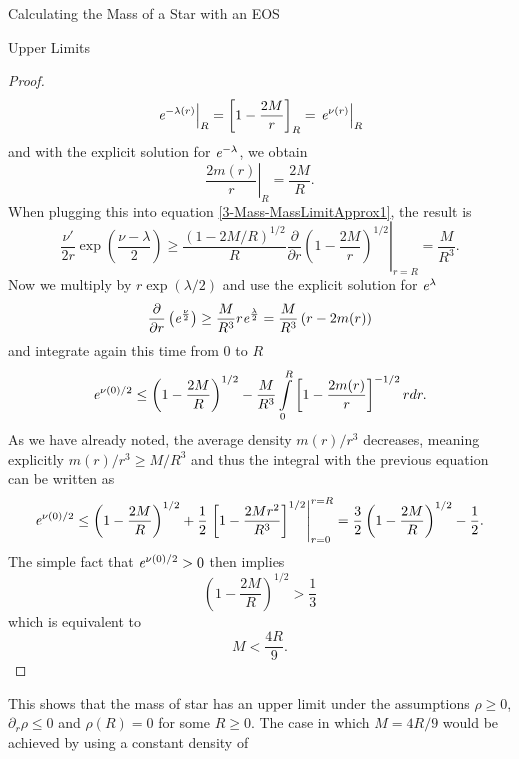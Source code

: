 \begin{section}{Calculating the Mass of a Star with an EOS}
\begin{subsection}{Upper Limits}
\begin{proof}
	\begin{equation}
		\left.\mathit{e}^{-\lambda(r)}\right|_R=\left[1-\frac{2M}{r}\right]_R=\left.\mathit{e}^{\nu(r)}\right|_R
		\label{3-Mass-MassLimitApprox1}
	\end{equation}
	and with the explicit solution for $\mathit{e}^{-\lambda}$, we obtain
	\begin{equation}
		\left.\frac{2m(r)}{r}\right|_R = \frac{2M}{R}.
	\end{equation}
	When plugging this into equation \eqref{3-Mass-MassLimitApprox1}, the result is
	\begin{equation}
		\frac{\nu'}{2r}\exp\left(\frac{\nu-\lambda}{2}\right)\geq\frac{(1-2M/R)^{1/2}}{R}\left.\frac{\partial}{\partial r}\left(1-\frac{2M}{r}\right)^{1/2}\right|_{r=R} = \frac{M}{R^3}.
	\end{equation}
	Now we multiply by $r\exp(\lambda/2)$ and use the explicit solution for $\mathit{e}^\lambda$
	\begin{equation}
		\frac{\partial}{\partial r}\left(\mathit{e}^{\frac{\nu}{2}}\right) \geq \frac{M}{R^3}r\mathit{e}^\frac{\lambda}{2} = \frac{M}{R^3}\left(r-2m(r)\right)
	\end{equation}
	and integrate again this time from $0$ to $R$
	\begin{equation}
		\mathit{e}^{\nu(0)/2}\leq\left(1-\frac{2M}{R}\right)^{1/2}-\frac{M}{R^3}\int\limits_0^R\left[1-\frac{2m(r)}{r} \right]^{-1/2}rdr.
		\label{3-Mass-MassLimitNuApprox}
	\end{equation}
	As we have already noted, the average density $m(r)/r^3$ decreases, meaning explicitly $m(r)/r^3\geq M/R^3$ and thus the integral with the previous equation can be written as
	\begin{equation}
		\mathit{e}^{\nu(0)/2}\leq\left(1-\frac{2M}{R}\right)^{1/2}+\frac{1}{2}\left.\left[1-\frac{2Mr^2}{R^3} \right]^{1/2}\right|^{r=R}_{r=0} = \frac{3}{2}\left(1-\frac{2M}{R}\right)^{1/2} - \frac{1}{2}.
	\end{equation}
	The simple fact that $\mathit{e}^{\nu(0)/2}>0$ then implies
	\begin{equation}
		\left(1-\frac{2M}{R}\right)^{1/2} > \frac{1}{3}
	\end{equation}
	which is equivalent to
	\begin{equation}
		M< \frac{4R}{9}.
	\end{equation}
\end{proof}\noindent
This shows that the mass of star has an upper limit under the assumptions $\rho\geq0$, $\partial_r\rho\leq0$ and $\rho(R)=0$ for some $R\geq0$. The case in which $M=4R/9$ would be achieved by using a constant density of 

\end{subsection}
\end{section}
